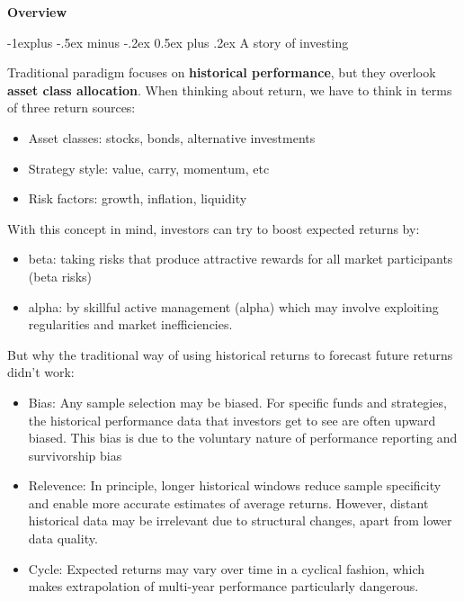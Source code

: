 \documentclass[10pt,portrait]{article}
\makeatletter
\renewcommand{\subsection}{\@startsection{subsection}{2}{0mm}%
                                {-1explus -.5ex minus -.2ex}%
                                {0.5ex plus .2ex}%
                                {\normalfont\normalsize\bfseries}}
\makeatother
\begin{document}


\newpage
    \begin{center}
         \Large{\textbf{Overview}} \\
    \end{center}

    \subsection{\color{blue}A story of investing}
    
    Traditional paradigm focuses on \textbf{historical performance}, but they overlook \textbf{asset class allocation}. When thinking about return, we have to think in terms of {\color{red}three return sources:}
    \begin{itemize}
        \item Asset classes: stocks, bonds, alternative investments
        \item Strategy style: value, carry, momentum, etc
        \item Risk factors: growth, inflation, liquidity
    \end{itemize}

    With this concept in mind, investors can try to boost expected returns by:
    \begin{itemize}
         \item beta: taking risks that produce attractive rewards for all market participants (beta risks)
         \item alpha: by skillful active management (alpha) which may involve exploiting regularities and market inefficiencies.
    \end{itemize}

    But why the traditional way of using historical returns to forecast future returns didn't work:
    \begin{itemize}
        \item Bias: Any sample selection may be biased. For specific funds and strategies, the historical performance data that investors get to see are often upward biased. This bias is due to the voluntary nature of performance reporting and survivorship bias
        \item Relevence: In principle, longer historical windows reduce sample specificity and enable more accurate estimates of average returns. However, distant historical data may be irrelevant due to structural changes, apart from lower data quality.
        \item Cycle: Expected returns may vary over time in a cyclical fashion, which makes extrapolation of multi-year performance particularly dangerous.
    \end{itemize}
\end{document}
